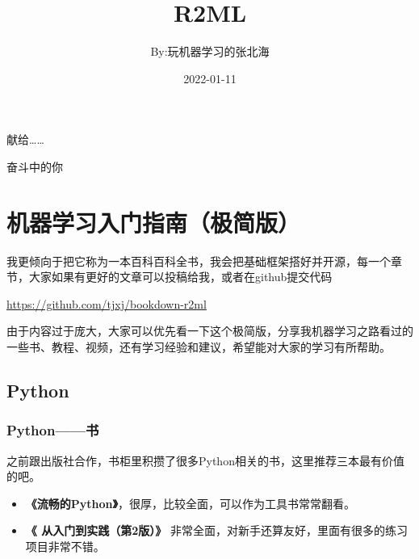 \documentclass[]{ctexbook}
\title{R2ML}
\author{By:玩机器学习的张北海}
\date{2022-01-11}
\providecommand{\tightlist}{%
  \setlength{\itemsep}{0pt}\setlength{\parskip}{0pt}}
\begin{document}
\maketitle


\thispagestyle{empty}

\begin{center}
献给……

奋斗中的你
\end{center}

\setlength{\abovedisplayskip}{-5pt}
\setlength{\abovedisplayshortskip}{-5pt}

{
\setcounter{tocdepth}{2}
\tableofcontents
}
\listoftables
\listoffigures
\hypertarget{ux673aux5668ux5b66ux4e60ux5165ux95e8ux6307ux5357ux6781ux7b80ux7248}{%
\chapter{机器学习入门指南（极简版）}\label{ux673aux5668ux5b66ux4e60ux5165ux95e8ux6307ux5357ux6781ux7b80ux7248}}

我更倾向于把它称为一本百科百科全书，我会把基础框架搭好并开源，每一个章节，大家如果有更好的文章可以投稿给我，或者在github提交代码

\url{https://github.com/tjxj/bookdown-r2ml}

由于内容过于庞大，大家可以优先看一下这个极简版，分享我机器学习之路看过的一些书、教程、视频，还有学习经验和建议，希望能对大家的学习有所帮助。

\hypertarget{python}{%
\section{Python}\label{python}}

\hypertarget{pythonux4e66}{%
\subsection{Python------书}\label{pythonux4e66}}

之前跟出版社合作，书柜里积攒了很多Python相关的书，这里推荐三本最有价值的吧。

\begin{itemize}
\tightlist
\item
  \textbf{《流畅的Python》}，很厚，比较全面，可以作为工具书常常翻看。
\end{itemize}

\begin{itemize}
\tightlist
\item
  \textbf{《 从入门到实践（第2版）》} 非常全面，对新手还算友好，里面有很多的练习项目非常不错。
\end{itemize}
\end{document}
